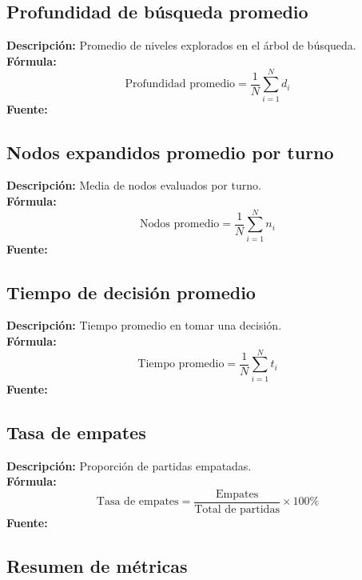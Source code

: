 \documentclass[conference]{IEEEtran}
\begin{document}
\subsection{Profundidad de búsqueda promedio}

\textbf{Descripción:} Promedio de niveles explorados en el árbol de búsqueda. \\
\textbf{Fórmula:}
\begin{equation}
	\text{Profundidad promedio} = \frac{1}{N} \sum_{i=1}^{N} d_i
\end{equation}
\textbf{Fuente:} \cite{russell2016artificial}

\subsection{Nodos expandidos promedio por turno}

\textbf{Descripción:} Media de nodos evaluados por turno. \\
\textbf{Fórmula:}
\begin{equation}
	\text{Nodos promedio} = \frac{1}{N} \sum_{i=1}^{N} n_i
\end{equation}
\textbf{Fuente:} \cite{russell2016artificial}

\subsection{Tiempo de decisión promedio}

\textbf{Descripción:} Tiempo promedio en tomar una decisión. \\
\textbf{Fórmula:}
\begin{equation}
	\text{Tiempo promedio} = \frac{1}{N} \sum_{i=1}^{N} t_i
\end{equation}
\textbf{Fuente:} \cite{campbell2002deep}

\subsection{Tasa de empates}

\textbf{Descripción:} Proporción de partidas empatadas. \\
\textbf{Fórmula:}
\begin{equation}
	\text{Tasa de empates} = \frac{\text{Empates}}{\text{Total de partidas}} \times 100\%
\end{equation}
\textbf{Fuente:} \cite{silver2016mastering}

\subsection*{Resumen de métricas}
\end{document}
